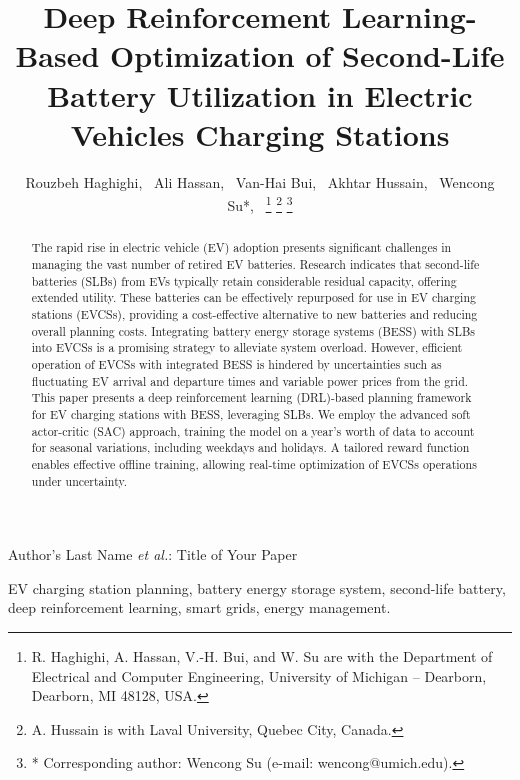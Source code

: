 \documentclass[10pt, journal]{IEEEtran}
\begin{document}
\title{Deep Reinforcement Learning-Based Optimization of Second-Life Battery Utilization in Electric Vehicles Charging Stations}

\author{Rouzbeh Haghighi,~
        Ali Hassan,~
        Van-Hai Bui,~
        Akhtar Hussain,~
        Wencong Su*,~
        \thanks{R. Haghighi, A. Hassan, V.-H. Bui, and W. Su are with the Department of Electrical and Computer Engineering, University of Michigan – Dearborn, Dearborn, MI 48128, USA.}
        \thanks{A. Hussain is with Laval University, Quebec City, Canada.}
        \thanks{* Corresponding author: Wencong Su (e-mail: wencong@umich.edu).}
        }
     
\markboth{}
{Author's Last Name \MakeLowercase{\textit{et al.}}: Title of Your Paper}

\maketitle
\begin{abstract}
The rapid rise in electric vehicle (EV) adoption presents significant challenges in managing the vast number of retired EV batteries. Research indicates that second-life batteries (SLBs) from EVs typically retain considerable residual capacity, offering extended utility. These batteries can be effectively repurposed for use in EV charging stations (EVCSs), providing a cost-effective alternative to new batteries and reducing overall planning costs. Integrating battery energy storage systems (BESS) with SLBs into EVCSs is a promising strategy to alleviate system overload. However, efficient operation of EVCSs with integrated BESS is hindered by uncertainties such as fluctuating EV arrival and departure times and variable power prices from the grid. This paper presents a deep reinforcement learning (DRL)-based planning framework for EV charging stations with BESS, leveraging SLBs. We employ the advanced soft actor-critic (SAC) approach, training the model on a year’s worth of data to account for seasonal variations, including weekdays and holidays. A tailored reward function enables effective offline training, allowing real-time optimization of EVCSs operations under uncertainty.
\end{abstract}
\begin{IEEEkeywords}
EV charging station planning, battery energy storage system, second-life
battery, deep reinforcement learning, smart grids, energy management.
\end{IEEEkeywords}
\end{document}
